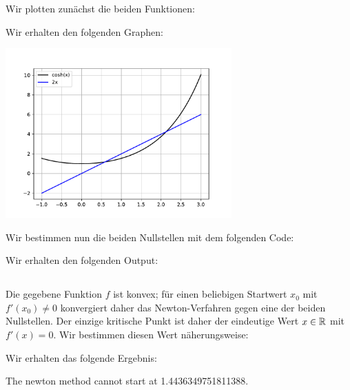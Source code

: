 \section{}



\subsection{}

Wir plotten zunächst die beiden Funktionen:



Wir erhalten den folgenden Graphen:

\begin{center}
  \includegraphics[width = 0.65\textwidth]{chapter_04/exercise_04_15_figure.pdf}
\end{center}

Wir bestimmen nun die beiden Nullstellen mit dem folgenden Code:



Wir erhalten den folgenden Output:




\subsection{}

Die gegebene Funktion $f$ ist konvex;
für einen beliebigen Startwert $x_0$ mit $f'(x_0) $ konvergiert daher das Newton-Verfahren gegen eine der beiden Nullstellen.
Der einzige kritische Punkt ist daher der eindeutige Wert $x \in \mathbb{R}$ mit $f'(x) = 0$.
Wir bestimmen diesen Wert näherungsweise:



Wir erhalten das folgende Ergebnis:

\begin{consoleoutput}
The newton method cannot start at 1.4436349751811388.
\end{consoleoutput}
